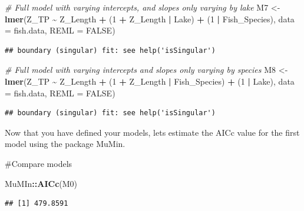 \documentclass[
]{article}
\newenvironment{Shaded}{\begin{snugshade}}{\end{snugshade}}
\newcommand{\AttributeTok}[1]{\textcolor[rgb]{0.13,0.29,0.53}{#1}}
\newcommand{\CommentTok}[1]{\textcolor[rgb]{0.56,0.35,0.01}{\textit{#1}}}
\newcommand{\ConstantTok}[1]{\textcolor[rgb]{0.56,0.35,0.01}{#1}}
\newcommand{\DecValTok}[1]{\textcolor[rgb]{0.00,0.00,0.81}{#1}}
\newcommand{\FunctionTok}[1]{\textcolor[rgb]{0.13,0.29,0.53}{\textbf{#1}}}
\newcommand{\NormalTok}[1]{#1}
\newcommand{\OtherTok}[1]{\textcolor[rgb]{0.56,0.35,0.01}{#1}}
\newcommand{\SpecialCharTok}[1]{\textcolor[rgb]{0.81,0.36,0.00}{\textbf{#1}}}
\begin{document}
\begin{Shaded}
\begin{Highlighting}[]
\CommentTok{\# Full model with varying intercepts, and slopes only varying by lake}
\NormalTok{M7 }\OtherTok{\textless{}{-}} \FunctionTok{lmer}\NormalTok{(Z\_TP }\SpecialCharTok{\textasciitilde{}}\NormalTok{ Z\_Length }\SpecialCharTok{+}\NormalTok{ (}\DecValTok{1} \SpecialCharTok{+}\NormalTok{ Z\_Length }\SpecialCharTok{|}\NormalTok{ Lake) }\SpecialCharTok{+}\NormalTok{ (}\DecValTok{1} \SpecialCharTok{|}\NormalTok{ Fish\_Species),}
     \AttributeTok{data =}\NormalTok{ fish.data, }\AttributeTok{REML =} \ConstantTok{FALSE}\NormalTok{)}
\end{Highlighting}
\end{Shaded}

\begin{verbatim}
## boundary (singular) fit: see help('isSingular')
\end{verbatim}

\begin{Shaded}
\begin{Highlighting}[]
\CommentTok{\# Full model with varying intercepts and slopes only varying by species}
\NormalTok{M8 }\OtherTok{\textless{}{-}} \FunctionTok{lmer}\NormalTok{(Z\_TP }\SpecialCharTok{\textasciitilde{}}\NormalTok{ Z\_Length }\SpecialCharTok{+}\NormalTok{ (}\DecValTok{1} \SpecialCharTok{+}\NormalTok{ Z\_Length }\SpecialCharTok{|}\NormalTok{ Fish\_Species) }\SpecialCharTok{+}\NormalTok{ (}\DecValTok{1} \SpecialCharTok{|}\NormalTok{ Lake),}
           \AttributeTok{data =}\NormalTok{ fish.data, }\AttributeTok{REML =} \ConstantTok{FALSE}\NormalTok{)}
\end{Highlighting}
\end{Shaded}

\begin{verbatim}
## boundary (singular) fit: see help('isSingular')
\end{verbatim}

Now that you have defined your models, lets estimate the AICc value for
the first model using the package MuMin.

\#Compare models

\begin{Shaded}
\begin{Highlighting}[]
\NormalTok{MuMIn}\SpecialCharTok{::}\FunctionTok{AICc}\NormalTok{(M0)}
\end{Highlighting}
\end{Shaded}

\begin{verbatim}
## [1] 479.8591
\end{verbatim}
\end{document}
